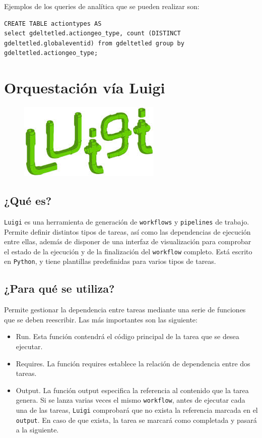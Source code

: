 \documentclass[]{article}
\begin{document}
Ejemplos de los queries de analítica que se pueden realizar son:

\begin{verbatim}
CREATE TABLE actiontypes AS
select gdeltetled.actiongeo_type, count (DISTINCT gdeltetled.globaleventid) from gdeltetled group by gdeltetled.actiongeo_type;
\end{verbatim}

\section{Orquestación vía Luigi}\label{orquestacion-via-luigi}

\begin{figure}[H]
\centering
\includegraphics[width=0.4 \textwidth]{img/luigi.jpeg}
\end{figure}

\subsection{¿Qué es?}\label{que-es-3}

\texttt{Luigi} es una herramienta de generación de \texttt{workflows} y
\texttt{pipelines} de trabajo. Permite definir distintos tipos de
tareas, así como las dependencias de ejecución entre ellas, además de
disponer de una interfaz de visualización para comprobar el estado de la
ejecución y de la finalización del \texttt{workflow} completo. Está
escrito en \texttt{Python}, y tiene plantillas predefinidas para varios
tipos de tareas.

\subsection{¿Para qué se utiliza?}\label{para-que-se-utiliza-3}

Permite gestionar la dependencia entre tareas mediante una serie de
funciones que se deben reescribir. Las más importantes son las
siguiente:

\begin{itemize}
\itemsep1pt\parskip0pt
\item
  Run. Esta función contendrá el código principal de la tarea que se
  desea ejecutar.
\item
  Requires. La función requires establece la relación de dependencia
  entre dos tareas.
\item
  Output. La función output especifica la referencia al contenido que la
  tarea genera. Si se lanza varias veces el mismo \texttt{workflow},
  antes de ejecutar cada una de las tareas, \texttt{Luigi} comprobará
  que no exista la referencia marcada en el \texttt{output}. En caso de
  que exista, la tarea se marcará como completada y pasará a la
  siguiente.
\end{itemize}
\end{document}
